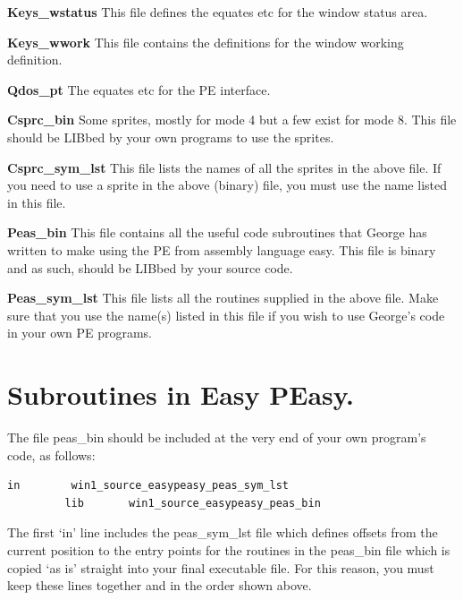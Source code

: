 {\bf Keys\_wstatus} 
This file defines the equates etc for the window status area.

{\bf Keys\_wwork} 
This file contains the definitions for the window working
            definition.

{\bf Qdos\_pt} 
The equates etc for the PE interface.

{\bf Csprc\_bin} 
Some sprites, mostly for mode 4 but a few exist for mode 8. This file
            should be LIBbed by your own programs to use the sprites.

{\bf Csprc\_sym\_lst} 
This file lists the names of all the sprites in the above file. If you
            need to use a sprite in the above (binary) file, you must use the name listed
            in this file.

{\bf Peas\_bin} 
This file contains all the useful code subroutines that George has
            written to make using the PE from assembly language easy. This file is binary
            and as such, should be LIBbed by your source code.

{\bf Peas\_sym\_lst} 
This file lists all the routines supplied in the above file. Make sure
            that you use the name(s) listed in this file if you wish to use George's code
            in your own PE programs.


\section{Subroutines in Easy PEasy.}
\label{ch26-sub-routines}%

The file peas\_bin should be included at the very end of your
        own program's code, as follows:

\begin{lstlisting}[firstnumber=1,caption={Invoking EasyPEasy in Your Own Programs}]
         in        win1_source_easypeasy_peas_sym_lst
         lib       win1_source_easypeasy_peas_bin
\end{lstlisting}

The first `in' line includes the peas\_sym\_lst file
        which defines offsets from the current position to the entry points for the
        routines in the peas\_bin file which is copied `as is'
        straight into your final executable file. For this reason, you must keep these
        lines together and in the order shown above.


